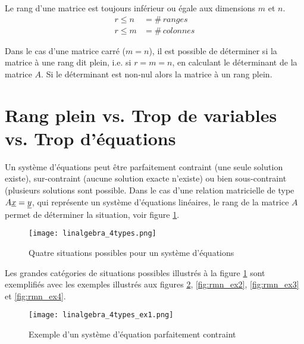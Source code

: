 Le rang d'une matrice est toujours inférieur ou égale aux dimensions $m$ et $n$.
\begin{align}
r \leq n &= \#\, ranges \\
r \leq m &= \#\, colonnes
\end{align}

Dans le cas d'une matrice carré ($m=n$), il est possible de déterminer si la matrice à une rang dit plein, i.e. si $r=m=n$, en calculant le déterminant de la matrice $A$. Si le déterminant est non-nul alors la matrice à un rang plein.  


\newpage
\section{Rang plein vs. Trop de variables vs. Trop d’équations}
\label{sec:rangpleinvstrop}

Un système d'équations peut être parfaitement contraint (une seule solution existe), sur-contraint (aucune solution exacte n'existe) ou bien sous-contraint (plusieurs solutions sont possible. Dans le cas d'une relation matricielle de type $A \underline{x} = \underline{y} $, qui représente un système d’équations linéaires, le rang de la matrice $A$ permet de déterminer la situation, voir figure \ref{fig:rmn}.

\begin{figure}[htp]
	\centering
		\texttt{[image: linalgebra\_4types.png]}
	\caption{Quatre situations possibles pour un système d'équations}
	\label{fig:rmn}
\end{figure}

Les grandes catégories de situations possibles illustrés à la figure \ref{fig:rmn} sont exemplifiés avec les exemples illustrés aux figures \ref{fig:rmn_ex1}, \ref{fig:rmn_ex2}, \ref{fig:rmn_ex3} et \ref{fig:rmn_ex4}.

\begin{figure}[htp]
	\centering
		\texttt{[image: linalgebra\_4types\_ex1.png]}
	\caption{Exemple d'un système d'équation parfaitement contraint}
	\label{fig:rmn_ex1}
\end{figure}

